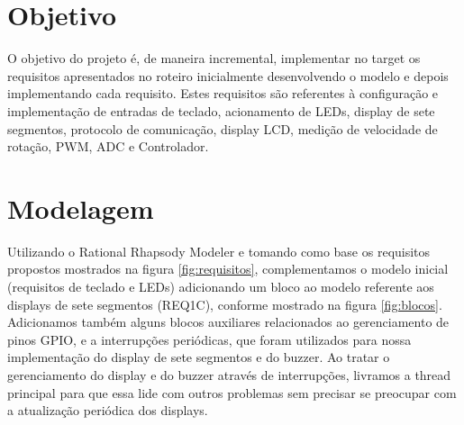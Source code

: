 \documentclass{article}
\begin{document}


\onehalfspacing
\section{Objetivo} 
O objetivo do projeto é, de maneira incremental, implementar no target os requisitos apresentados no roteiro\cite{bb:roteiro} inicialmente desenvolvendo o modelo e depois implementando cada requisito. Estes requisitos são referentes à configuração e implementação de entradas de teclado, acionamento de LEDs, display de sete segmentos, protocolo de comunicação, display LCD, medição de velocidade de rotação, PWM, ADC e Controlador. 
	
\section{Modelagem}
Utilizando o Rational Rhapsody Modeler e tomando como base os requisitos propostos mostrados na figura \ref{fig:requisitos}, complementamos o modelo inicial\cite{bb:modelo} (requisitos de teclado e LEDs) adicionando um bloco ao modelo referente aos displays de sete segmentos (REQ1C), conforme mostrado na figura \ref{fig:blocos}. Adicionamos também alguns blocos auxiliares relacionados ao gerenciamento de pinos GPIO, e a interrupções periódicas, que foram utilizados para nossa implementação do display de sete segmentos e do buzzer. Ao tratar o gerenciamento do display e do buzzer através de interrupções, livramos a thread principal para que essa lide com outros problemas sem precisar se preocupar com a atualização periódica dos displays.
\end{document}
